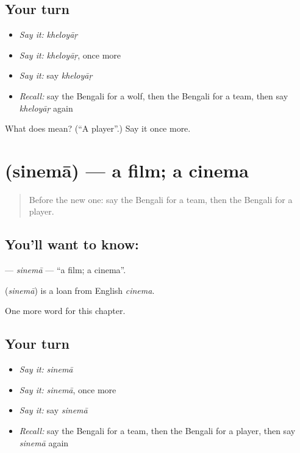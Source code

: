 \subsection*{Your turn}
\begin{itemize}
\raggedright
  \item \emph{Say it:} \emph{kheloyāṛ}
  \item \emph{Say it:} \emph{kheloyāṛ}, once more
  \item \emph{Say it:} say \emph{kheloyāṛ}
  \item \emph{Recall:} say the Bengali for a wolf, then the Bengali for a team, then say \emph{kheloyāṛ} again
\end{itemize}

\begin{tcolorbox}[breakable,colback=teal!4,colframe=teal!35!black,title={Before you move on}]
What does  mean? (\textquotedblleft{}A player\textquotedblright{}.) Say it once more.
\end{tcolorbox}
\section[\texorpdfstring{\bn{সিনেমা} (sinemā)}{সিনেমা (sinemā)}]{ (sinemā) — a film; a cinema}

\label{lesson:BN-C225-sinema}



\begin{quote}
Before the new one: say the Bengali for a team, then the Bengali for a player.
\end{quote}

\subsection*{You'll want to know: }
\textbf{} — \emph{sinemā} — \textquotedblleft{}a film; a cinema\textquotedblright{}.

\begin{cousinweb}
\textbf{} (\emph{sinemā}) is a loan from English \emph{cinema}.
\end{cousinweb}

\begin{grammarlens}[title={What you've built}]
One more word for this chapter.
\end{grammarlens}

\subsection*{Your turn}
\begin{itemize}
\raggedright
  \item \emph{Say it:} \emph{sinemā}
  \item \emph{Say it:} \emph{sinemā}, once more
  \item \emph{Say it:} say \emph{sinemā}
  \item \emph{Recall:} say the Bengali for a team, then the Bengali for a player, then say \emph{sinemā} again
\end{itemize}

